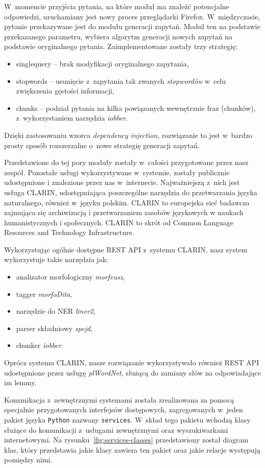 W~momencie przyjścia pytania, na które moduł ma znaleźć potencjalne odpowiedzi, uruchamiany jest nowy proces przeglądarki Firefox. W~międzyczasie, pytanie przekazywane jest do modułu generacji zapytań. Moduł ten na podstawie przekazanego parametru, wybiera algorytm generacji nowych zapytań na podstawie oryginalnego pytania.
Zaimplementowane zostały trzy strategię:
\begin{itemize}
    \item singlequery -- brak modyfikacji oryginalnego zapytania,
    \item stopwords -- usunięcie z~zapytania tak zwanych \textit{stopwordów} w~celu zwiększenia gęstości informacji,
    \item chunks -- podział pytania na kilka powiązanych wewnętrznie fraz (chunków), z~wykorzystaniem narzędzia \textit{iobber}.
\end{itemize}
Dzięki zastosowaniu wzorca \textit{dependency injection}, rozwiązanie to jest w~bardzo prosty sposób rozszerzalne o~nowe strategię generacji zapytań. 

Przedstawione do tej pory moduły zostały w~całości przygotowane przez nasz zespół. Pozostałe usługi wykorzystywane w~systemie, zostały publicznie udostępnione i znalezione przez nas w~internecie. Najważniejszą z~nich jest usługa CLARIN, udostępniająca poszczególne narzędzia do przetwarzania języka naturalnego, również w~języku polskim. CLARIN to europejska sieć badawcza zajmująca się archiwizacją i przetwarzaniem zasobów językowych w naukach humanistycznych i społecznych. CLARIN to skrót od Common Language Resources and Technology Infrastructure.

Wykorzystując ogólnie dostępne REST API z~systemu CLARIN, nasz system wykorzystuje takie narzędzia jak:
\begin{itemize}
    \item analizator morfologiczny \textit{morfeusz},
    \item tagger \textit{morfoDita},
    \item narzędzie do NER \textit{liner2},
    \item parser składniowy \textit{spejd},
    \item chunker \textit{iobber}.
\end{itemize}

Oprócz systemu CLARIN, nasze rozwiązanie wykorzystywało również REST API udostępnione przez usługę \textit{plWordNet}, służącą do zamiany słów na odpowiadające im lemmy.

Komunikacja z~zewnętrznymi systemami została zrealizowana za pomocą specjalnie przygotowanych interfejsów dostępowych, zagregowanych w~jeden pakiet języka \texttt{Python} nazwany \texttt{services}. W~skład tego pakietu wchodzą klasy służące do komunikacji z~usługami zewnętrznymi oraz wyszukiwarkami internetowymi. Na rysunku~\ref{fig:services-classes} przedstawiony został diagram klas, który przedstawia jakie klasy zawiera ten pakiet oraz jakie relacje występują pomiędzy nimi.

